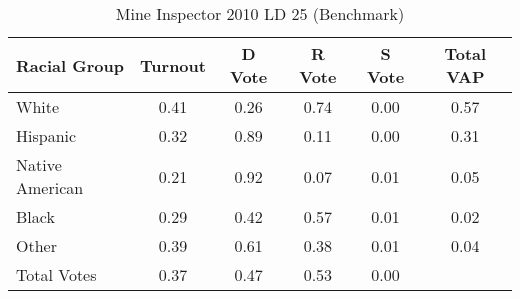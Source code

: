 \begin{table}[htb]
\begin{center}
\caption{Mine Inspector 2010 LD 25 (Benchmark)}
\label{smine_vap_ld_25_benchmark}
\begin{tabular}{lccccc}
  \hline
Racial Group & Turnout & D Vote & R Vote & S Vote & Total VAP \\ 
  \hline
White & 0.41 & 0.26 & 0.74 & 0.00 & 0.57 \\ 
  Hispanic & 0.32 & 0.89 & 0.11 & 0.00 & 0.31 \\ 
  Native American & 0.21 & 0.92 & 0.07 & 0.01 & 0.05 \\ 
  Black & 0.29 & 0.42 & 0.57 & 0.01 & 0.02 \\ 
  Other & 0.39 & 0.61 & 0.38 & 0.01 & 0.04 \\ 
  Total Votes & 0.37 & 0.47 & 0.53 & 0.00 &  \\ 
   \hline
\end{tabular}
\end{center}
\end{table}
